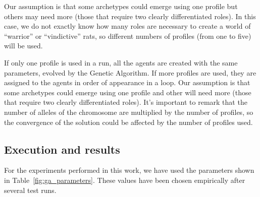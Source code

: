 \documentclass{sig-alternate}
\begin{document}
Our assumption is that
some archetypes could emerge using one profile but others may need
more (those that require two clearly differentiated roles). In this case,
 we do not exactly know how many roles are necessary to create a world of ``warrior'' or ``vindictive''
  rats, so different numbers of profiles (from one to five) will be used.



If only one profile is used
in a run, all the agents are created with the same parameters, evolved
by the Genetic Algorithm. If more profiles are used, they are assigned
to the agents in order of appearance in a loop. Our assumption is that
some archetypes could emerge using one profile and other will need
more (those that require two clearly differentiated roles). It's
important to remark that the number of alleles of the chromosome are
multiplied by the number of profiles, so the convergence of the
solution could be affected by the number of profiles used. 




\subsection{Execution and results}

For the experiments performed in this work, we have used the parameters shown in Table~\ref{fig:ga_parameters}. These values have been chosen empirically after several test runs.
\end{document}
